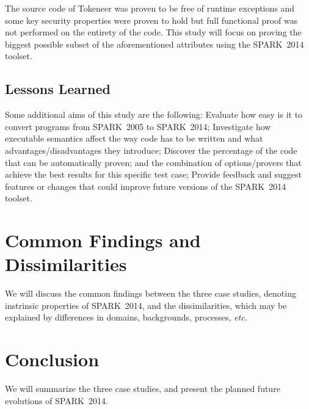 \documentclass[10pt,a4paper,twocolumn]{article}
\newcommand{\oldspark}{SPARK~2005\xspace}
\newcommand{\newspark}{SPARK~2014\xspace}
\newcommand{\etc}{\textit{etc.}\xspace}
\begin{document}
The source code of Tokeneer was proven to be free of runtime exceptions
and some key security properties were proven to hold but full functional
proof was not performed on the entirety of the code. This study will
focus on proving the biggest possible subset of the aforementioned
attributes using the \newspark toolset.

\subsection{Lessons Learned}

Some additional aims of this study are the following:
   Evaluate how easy is it to convert programs from \oldspark to \newspark;
   Investigate how executable semantics affect the way code has to be written
        and what advantages/disadvantages they introduce;
   Discover the percentage of the code that can be automatically proven;
        and the combination of options/provers that achieve the best results
        for this specific test case;
   Provide feedback and suggest features or changes that could improve future versions of the \newspark toolset.

\section{Common Findings and Dissimilarities}

We will discuss the common findings between the three case studies, denoting
instrinsic properties of \newspark, and the dissimilarities, which may be
explained by differences in domains, backgrounds, processes, \etc

\section{Conclusion}

We will summarize the three case studies, and present the planned future
evolutions of \newspark.



\end{document}
